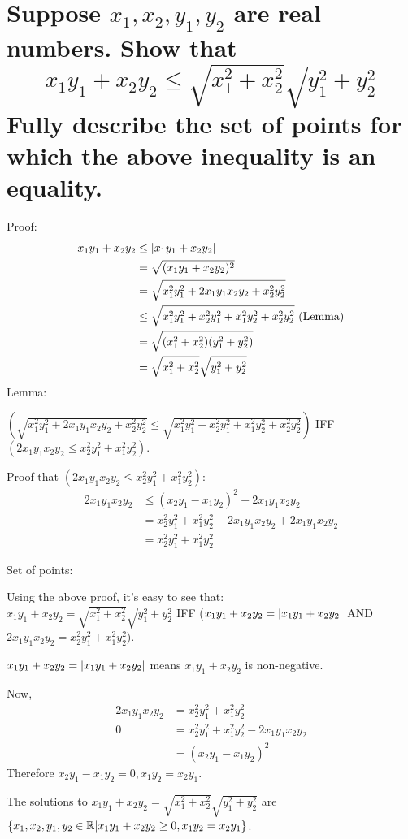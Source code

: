 \section{Suppose $x_1, x_2, y_1, y_2$ are real numbers. Show that 
    \[x_1y_1 + x_2y_2 \leq \sqrt{x_1^2 + x_2^2}\sqrt{y_1^2 + y_2^2}
        \]
    Fully describe the set of points for which the above inequality is an equality.}
    Proof: 
    \begin{align*}
        x_1y_1 + x_2y_2 &\leq \left|x_1y_1 + x_2y_2\right| \\ 
        &= \sqrt{(x_1y_1 + x_2y_2)^2} \\ 
        &= \sqrt{x_1^2y_1^2 + 2x_1y_1x_2y_2 + x_2^2y_2^2} \\ 
        &\leq \sqrt{x_1^2y_1^2 + x_2^2y_1^2 + x_1^2y_2^2 + x_2^2y_2^2} \text{ (Lemma)}\\ 
        &= \sqrt{(x_1^2 + x_2^2) (y_1^2 + y_2^2)} \\ 
        &= \sqrt{x_1^2 + x_2^2}\sqrt{y_1^2 + y_2^2} \\ 
    \end{align*}
    Lemma:

    $(\sqrt{x_1^2y_1^2 + 2x_1y_1x_2y_2 + x_2^2y_2^2} 
    \leq \sqrt{x_1^2y_1^2 + x_2^2y_1^2 + x_1^2y_2^2 + x_2^2y_2^2})$
    IFF $(2x_1y_1x_2y_2 \leq x_2^2y_1^2 + x_1^2y_2^2)$.

    Proof that $(2x_1y_1x_2y_2 \leq x_2^2y_1^2 + x_1^2y_2^2)$:
    \begin{align*}
        2x_1y_1x_2y_2
        &\leq (x_2y_1 - x_1y_2)^2 + 2x_1y_1x_2y_2 \\ 
        &= x_2^2y_1^2 + x_1^2y_2^2 - 2x_1y_1x_2y_2 + 2x_1y_1x_2y_2 \\ 
        &= x_2^2y_1^2 + x_1^2y_2^2
    \end{align*}

    Set of points: 

    Using the above proof, it's easy to see that: \\ 
    $x_1y_1 + x_2y_2 = \sqrt{x_1^2 + x_2^2}\sqrt{y_1^2 + y_2^2}$
    IFF 
    ($x_1y_1 + x_2y_2 = \left|x_1y_1 + x_2y_2\right|$
    AND $2x_1y_1x_2y_2 = x_2^2y_1^2 + x_1^2y_2^2$).

    $x_1y_1 + x_2y_2 = \left|x_1y_1 + x_2y_2\right|$ means $x_1y_1 + x_2y_2$ is non-negative.

    Now, 
    \begin{align*}
        2x_1y_1x_2y_2 &= x_2^2y_1^2 + x_1^2y_2^2 \\ 
        0 &= x_2^2y_1^2 + x_1^2y_2^2 - 2x_1y_1x_2y_2 \\ 
        &= (x_2y_1 - x_1y_2)^2
    \end{align*}
    Therefore $x_2y_1 - x_1y_2 = 0, x_1y_2 = x_2y_1$.

    The solutions to $x_1y_1 + x_2y_2 = \sqrt{x_1^2 + x_2^2}\sqrt{y_1^2 + y_2^2}$
    are $\{ x_1,x_2,y_1,y_2 \in \mathbb{R} | x_1y_1 + x_2y_2 \geq 0, x_1y_2 = x_2y_1 \}$.